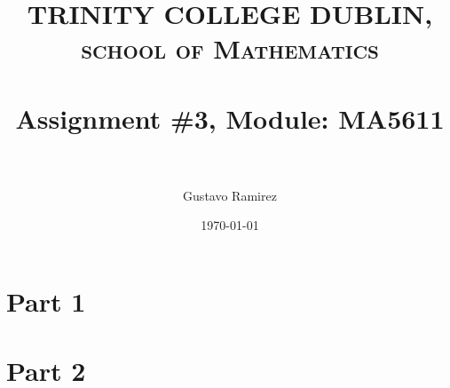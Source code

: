 \documentclass[paper=a4, fontsize=11pt]{scrartcl} %
\title{	
\normalfont \normalsize 
\textsc{TRINITY COLLEGE DUBLIN, school of Mathematics} \\ [25pt] %
\horrule{0.5pt} \\[0.4cm] %
\huge Assignment \#3, Module: MA5611 \\ %
\horrule{2pt} \\[0.5cm] %
}
\author{Gustavo Ramirez} %
\date{\normalsize\today} %
\numberwithin{equation}{section} %
\numberwithin{figure}{section} %
\numberwithin{table}{section} %
\begin{document}
\maketitle %


\begin{comment}
\section{Problem description}

\begin{enumerate}
\item 
\item 
\item 
\item 
\end{enumerate}

\end{comment}

\newpage


\begin{comment}

USEFUL LINKS:

official sources for terminology:
-----
http://www.intel.com/content/www/us/en/support/topics/glossary.html
https://www-01.ibm.com/software/globalization/terminology/a.html
-----




about IMB processors:
-----

insert in google: list of ibm processors
https://en.wikipedia.org/wiki/List_of_IBM_products
https://www-01.ibm.com/software/passportadvantage/guide_to_identifying_processor_family.html
http://www.nextplatform.com/2015/08/10/ibm-roadmap-extends-power-chips-to-2020-and-beyond/
http://www.theverge.com/2015/7/9/8919091/ibm-7nm-transistor-processor
https://www.ibm.com/developerworks/ibmi/library/i-ibmi-7_2-and-ibm-power8/
-----




\end{comment}


\section{Part 1}




\section{Part 2}
\end{document}
